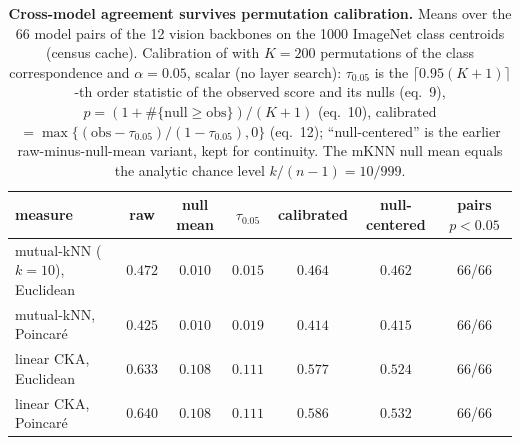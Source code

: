 \begin{table}[H]
\centering
\footnotesize
\setlength{\tabcolsep}{3pt}
\begin{tabular}{lcccccc}
\toprule
measure & raw & null mean & $\tau_{0.05}$ & calibrated & null-centered & pairs $p<0.05$ \\
\midrule
mutual-kNN ($k{=}10$), Euclidean & $0.472$ & $0.010$ & $0.015$ & $0.464$ & $0.462$ & 66/66 \\
mutual-kNN, Poincar\'e & $0.425$ & $0.010$ & $0.019$ & $0.414$ & $0.415$ & 66/66 \\
linear CKA, Euclidean & $0.633$ & $0.108$ & $0.111$ & $0.577$ & $0.524$ & 66/66 \\
linear CKA, Poincar\'e & $0.640$ & $0.108$ & $0.111$ & $0.586$ & $0.532$ & 66/66 \\
\bottomrule
\end{tabular}
\caption{\textbf{Cross-model agreement survives permutation calibration.} Means over the 66 model pairs of the 12 vision backbones on the 1000 ImageNet class centroids (census cache). Calibration of \citet{groger2026aristotelian} with $K{=}200$ permutations of the class correspondence and $\alpha{=}0.05$, scalar (no layer search): $\tau_{0.05}$ is the $\lceil0.95(K{+}1)\rceil$-th order statistic of the observed score and its nulls (eq.\ 9), $p=(1+\#\{\text{null}\ge\text{obs}\})/(K{+}1)$ (eq.\ 10), calibrated $=\max\{(\text{obs}-\tau_{0.05})/(1-\tau_{0.05}),0\}$ (eq.\ 12); ``null-centered'' is the earlier raw-minus-null-mean variant, kept for continuity. The mKNN null mean equals the analytic chance level $k/(n{-}1)=10/999$. %
}
\label{tab:b31-groger}
\end{table}

